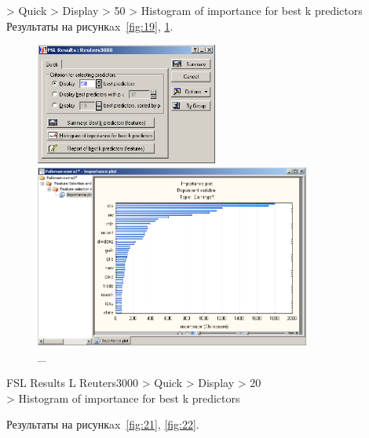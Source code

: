 > Quick > Display > 50 > Histogram of importance for best k predictors \\

Результаты на рисункax~\ref{fig:19}, \ref{fig:20}.

\begin{figure}[!h]
  \centering

  \begin{minipage}{0.29\textwidth}
    \centering

    \includegraphics[height=4cm]
    {inc/19.PNG}

    \caption{\_}

    \label{fig:19}
  \end{minipage}
  \begin{minipage}{0.69\textwidth}
    \centering

    \includegraphics[height=6cm]
    {inc/20.PNG}

    \caption{\_}

    \label{fig:20}
  \end{minipage}
\end{figure}

FSL Results L Reuters3000 > Quick > Display > 20 \\
> Histogram of importance for best k predictors

Результаты на рисункax~\ref{fig:21}, \ref{fig:22}.

